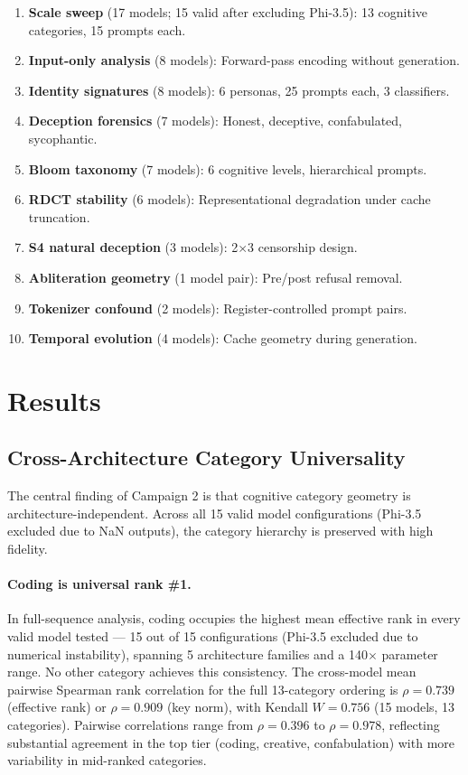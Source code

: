 \documentclass[11pt,a4paper]{article}
\begin{document}
\begin{enumerate}[leftmargin=*]
    \item \textbf{Scale sweep} (17 models; 15 valid after excluding Phi-3.5): 13 cognitive categories, 15 prompts each.
    \item \textbf{Input-only analysis} (8 models): Forward-pass encoding without generation.
    \item \textbf{Identity signatures} (8 models): 6 personas, 25 prompts each, 3 classifiers.
    \item \textbf{Deception forensics} (7 models): Honest, deceptive, confabulated, sycophantic.
    \item \textbf{Bloom taxonomy} (7 models): 6 cognitive levels, hierarchical prompts.
    \item \textbf{RDCT stability} (6 models): Representational degradation under cache truncation.
    \item \textbf{S4 natural deception} (3 models): 2$\times$3 censorship design.
    \item \textbf{Abliteration geometry} (1 model pair): Pre/post refusal removal.
    \item \textbf{Tokenizer confound} (2 models): Register-controlled prompt pairs.
    \item \textbf{Temporal evolution} (4 models): Cache geometry during generation.
\end{enumerate}

\section{Results}
\label{sec:results}

\subsection{Cross-Architecture Category Universality}
\label{sec:universality}

The central finding of Campaign 2 is that cognitive category geometry is architecture-independent. Across all 15 valid model configurations (Phi-3.5 excluded due to NaN outputs), the category hierarchy is preserved with high fidelity.

\paragraph{Coding is universal rank \#1.} In full-sequence analysis, coding occupies the highest mean effective rank in every valid model tested --- 15 out of 15 configurations (Phi-3.5 excluded due to numerical instability), spanning 5 architecture families and a 140$\times$ parameter range. No other category achieves this consistency. The cross-model mean pairwise Spearman rank correlation for the full 13-category ordering is $\rho = 0.739$ (effective rank) or $\rho = 0.909$ (key norm), with Kendall $W = 0.756$ (15 models, 13 categories). Pairwise correlations range from $\rho = 0.396$ to $\rho = 0.978$, reflecting substantial agreement in the top tier (coding, creative, confabulation) with more variability in mid-ranked categories.
\end{document}
